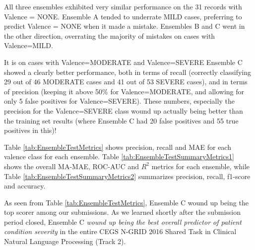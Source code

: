All three ensembles exhibited very similar performance
on the 31 records with \textsf{Valence = NONE}.
\textsf{Ensemble A} tended to underrate \textsf{MILD}
cases, preferring to predict \textsf{Valence = NONE}
when it made a mistake.  \textsf{Ensembles B} and \textsf{C}
went in the other direction, overrating the majority
of mistakes on cases with \textsf{Valence=MILD}.

It is on cases with \textsf{Valence=MODERATE} and \textsf{Valence=SEVERE}
\textsf{Ensemble C} showed a clearly better performance, both
in terms of recall (correctly classifying 29 out of 46 \textsf{MODERATE}
cases and 41 out of 53 \textsf{SEVERE} cases), and in terms
of precision (keeping it above 50\% for \textsf{Valence=MODERATE},
and allowing for only 5 false positives for \textsf{Valence=SEVERE}).
These numbers, especially the precision for the
\textsf{Valence=SEVERE} class wound up actually
being better than the training set results (where
\textsf{Ensemble C} had 20 false positives and 55 true positives
in this)!

Table \ref{tab:EnsembleTestMetrics} shows precision, recall
and \textsf{MAE} for each valence class for each ensemble.
Table \ref{tab:EnsembleTestSummaryMetrics1} shows the overall
\textsf{MA-MAE}, \textsf{ROC-AUC} and \textsf{$R^2$} metrics for each
ensemble, while Table \ref{tab:EnsembleTestSummaryMetrics2} summarizes
precision, recall, f1-score and accuracy.

As seen from Table \ref{tab:EnsembleTestMetrics}, \textsf{Ensemble C}
wound up being the top scorer among our submissions.  
As we learned shortly after the submission period closed, 
\textsf{Ensemble C} \textit{wound up being the best overall predictor of
patient condition severity} in the entire CEGS N-GRID 2016 Shared Task in Clinical Natural Language Processing (Track 2).
